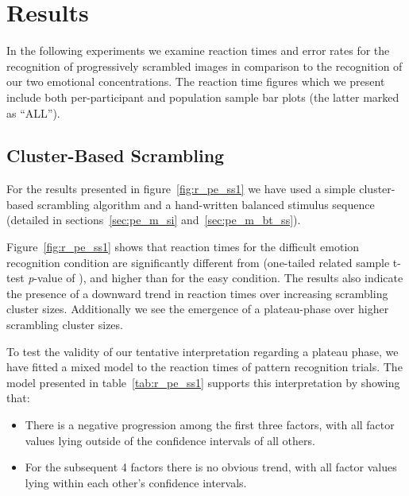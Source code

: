     \section{Results}\label{sec:pe_r}
	In the following experiments we examine reaction times and error rates for the recognition of progressively scrambled images in comparison to the recognition of our two emotional concentrations.
	The reaction time figures which we present include both per-participant and population sample bar plots (the latter marked as “ALL”).
	\subsection{Cluster-Based Scrambling}\label{sec:pe_r_ss}
	    For the results presented in figure~\ref{fig:r_pe_ss1} we have used a simple cluster-based scrambling algorithm and a hand-written balanced stimulus sequence 
	    (detailed in sections~\ref{sec:pe_m_si} and~\ref{sec:pe_m_bt_ss}).
	    
	    Figure~\ref{fig:r_pe_ss1} shows that reaction times for the difficult emotion recognition condition are significantly different from (one-tailed related sample t-test \textit{p}-value of 
	    ),
	    and higher than for the easy condition.
	    The results also indicate the presence of a downward trend in reaction times over increasing scrambling cluster sizes.
	    Additionally we see the emergence of a plateau-phase over higher scrambling cluster sizes.
	    
	    To test the validity of our tentative interpretation regarding a plateau phase, we have fitted a mixed model to the reaction times of pattern recognition trials.
	    The model presented in table~\ref{tab:r_pe_ss1} supports this interpretation by showing that:
	    \begin{itemize}
		\item There is a negative progression among the first three factors, with all factor values lying outside of the confidence intervals of all others.
		\item For the subsequent 4 factors there is no obvious trend, with all factor values lying within each other's confidence intervals. 
	    \end{itemize}

